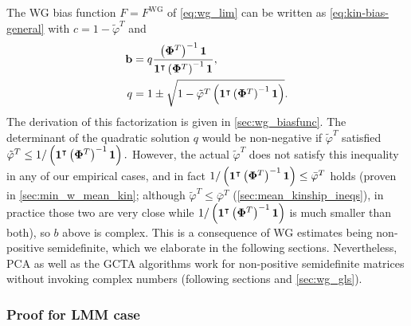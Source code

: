 \documentclass[11pt]{article}
\newcommand{\kinMat}[1][T]{%
  \ensuremath{%
    \mathbf{\Phi}^{#1}
  }%
  \xspace%
}%
\begin{document}
The WG bias function $F = F^\text{WG}$ of \cref{eq:wg_lim} can be written as \cref{eq:kin-bias-general} with
$c = 1 - \tilde{\varphi}^T$ and
\begin{align}
  \label{eq:wg-fac-b}
  \mathbf{b}
  &=
    q \frac{ \left( \kinMat \right)^{-1} \mathbf{1} }{ \mathbf{1}^\intercal \left( \kinMat \right)^{-1} \mathbf{1} }
    , \\
  \label{eq:wg-fac-q}
  q
  &=
    1 \pm \sqrt{1 - \tilde{\varphi}^T \left( \mathbf{1}^\intercal \left( \kinMat \right)^{-1} \mathbf{1} \right) }
.
\end{align}
The derivation of this factorization is given in \cref{sec:wg_biasfunc}.
The determinant of the quadratic solution $q$ would be non-negative if $\tilde{\varphi}^T$ satisfied
$
\tilde{\varphi}^T \le 1 / \left( \mathbf{1}^\intercal \left( \kinMat \right)^{-1} \mathbf{1} \right).
$
However, the actual $\tilde{\varphi}^T$ does not satisfy this inequality in any of our empirical cases, and in fact $1 / \left( \mathbf{1}^\intercal \left( \kinMat \right)^{-1} \mathbf{1} \right) \le \bar{\varphi}^T$ holds (proven in \cref{sec:min_w_mean_kin}; although $\tilde{\varphi}^T \le \bar{\varphi}^T$ (\cref{sec:mean_kinship_ineqs}), in practice those two are very close while $1 / \left( \mathbf{1}^\intercal \left( \kinMat \right)^{-1} \mathbf{1} \right)$ is much smaller than both), so $b$ above is complex.
This is a consequence of WG estimates being non-positive semidefinite, which we elaborate in the following sections.
Nevertheless, PCA as well as the GCTA algorithms work for non-positive semidefinite matrices without invoking complex numbers (following sections and \cref{sec:wg_gls}).

\subsubsection{Proof for LMM case}
\end{document}
